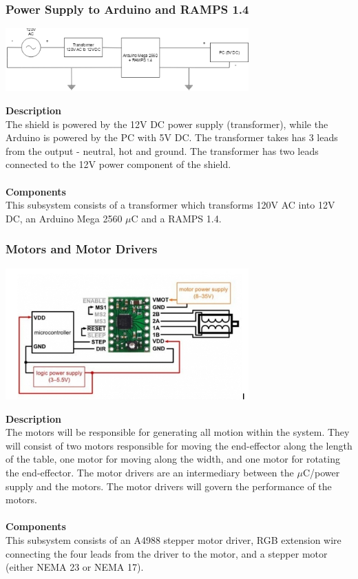 \documentclass[titlepage]{article}
\begin{document}
\newpage
\subsubsection{Power Supply to Arduino and RAMPS 1.4}
\begin{center}
	\includegraphics[width = 0.7\textwidth]{PowerSupply.png}
\label{fig:PowerSupplyFig}
\end{center}
\textbf{Description}\\
The shield is powered by the 12V DC power supply (transformer), while the Arduino is powered by the PC with 5V DC. The transformer takes has 3 leads from the output - neutral, hot and ground. The transformer has two leads connected to the 12V power component of the shield.\\\\
\textbf{Components}\\
This subsystem consists of a transformer which transforms 120V AC into 12V DC, an Arduino Mega 2560 $\mu$C and a RAMPS 1.4.

\subsubsection{Motors and Motor Drivers}
\begin{center}
	\includegraphics[width = 0.7\textwidth]{Motors.png}
\label{fig:MotorsFig}
\end{center}
\textbf{Description}\\
The motors will be responsible for generating all motion within the system. They will consist of two motors responsible for moving the end-effector along the length of the table, one motor for moving along the width, and one motor for rotating the end-effector. The motor drivers are an intermediary between the $\mu$C/power supply and the motors. The motor drivers will govern the performance of the motors.\\\\
\textbf{Components}\\
This subsystem consists of an A4988 stepper motor driver, RGB extension wire connecting the four leads from the driver to the motor, and a stepper motor (either NEMA 23 or NEMA 17).
\end{document}
